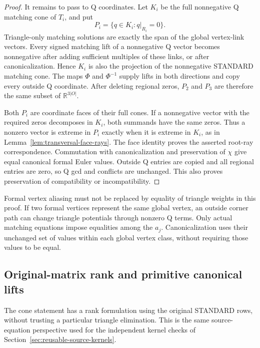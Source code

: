 \begin{proof}
It remains to pass to Q coordinates.  Let $K_i$ be the full nonnegative
Q matching cone of $T_i$, and put
\[
                 P_i=\{q\in K_i:q|_{R_i}=0\}.
\]
Triangle-only matching solutions are exactly the span of the global
vertex-link vectors.  Every signed matching lift of a nonnegative Q
vector becomes nonnegative after adding sufficient multiples of these
links, or after canonicalization.  Hence $K_i$ is also the projection
of the nonnegative STANDARD matching cone.  The maps $\Phi$ and
$\Phi^{-1}$ supply lifts in both directions and copy every outside Q
coordinate.  After deleting regional zeros, $P_2$ and $P_3$ are therefore
the same subset of $\mathbb R^{3|O|}$.

Both $P_i$ are coordinate faces of their full cones.  If a nonnegative
vector with the required zeros decomposes in $K_i$, both summands have
the same zeros.  Thus a nonzero vector is extreme in $P_i$ exactly when
it is extreme in $K_i$, as in Lemma~\ref{lem:transversal-face-rays}.
The face identity proves the asserted root-ray correspondence.
Commutation with canonicalization and preservation of $\chi$ give equal
canonical formal Euler values.  Outside Q entries are copied and all
regional entries are zero, so Q gcd and conflicts are unchanged.  This
also proves preservation of compatibility or incompatibility.
\end{proof}

Formal vertex aliasing must not be replaced by equality of triangle
weights in this proof.  If two formal vertices represent the same global
vertex, an outside corner path can change triangle potentials through
nonzero Q terms.  Only actual matching equations impose equalities among
the $a_j$.  Canonicalization uses their unchanged set of values within
each global vertex class, without requiring those values to be equal.

\subsection{Original-matrix rank and primitive canonical lifts}

The cone statement has a rank formulation using the original STANDARD
rows, without trusting a particular triangle elimination.  This is the
same source-equation perspective used for the independent kernel checks
of Section~\ref{sec:reusable-source-kernels}.

